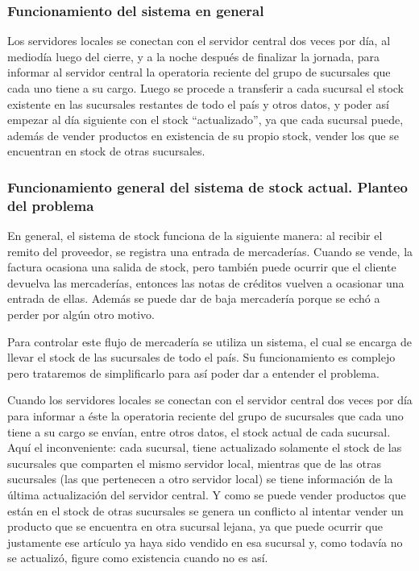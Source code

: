 \subsubsection{Funcionamiento del sistema en general}

Los servidores locales se conectan con el servidor central dos veces por día,
al mediodía luego del cierre, y a la noche después de finalizar la jornada,
para informar al servidor central la operatoria reciente del grupo de
sucursales que cada uno tiene a su cargo. Luego se procede a transferir a cada
sucursal el stock existente en las sucursales restantes de todo el país y otros
datos, y poder así empezar al día siguiente con el stock ``actualizado'', ya
que cada sucursal puede, además de vender productos en existencia de su propio
stock, vender los que se encuentran en stock de otras sucursales.


\subsubsection{Funcionamiento general del sistema de stock actual. Planteo del
problema}

En general, el sistema de stock funciona de la siguiente manera: al recibir el
remito del proveedor, se registra una entrada de mercaderías. Cuando se vende,
la factura ocasiona una salida de stock, pero también puede ocurrir que el
cliente devuelva las mercaderías, entonces las notas de créditos vuelven a
ocasionar una entrada de ellas. Además se puede dar de baja mercadería porque
se echó a perder por algún otro motivo.

Para controlar este flujo de mercadería se utiliza un sistema, el cual se
encarga de llevar el stock de las sucursales de todo el país. Su funcionamiento
es complejo pero trataremos de simplificarlo para así poder dar a entender el
problema. 

Cuando los servidores locales se conectan con el servidor central dos veces por
día para informar a éste la operatoria reciente del grupo de sucursales que
cada uno tiene a su cargo se envían, entre otros datos, el stock actual de cada
sucursal. Aquí el inconveniente: cada sucursal, tiene actualizado solamente el
stock de las sucursales que comparten el mismo servidor local, mientras que de
las otras sucursales (las que pertenecen a otro servidor local) se tiene
información de la última actualización del servidor central. Y como se puede
vender productos que están en el stock de otras sucursales se genera un
conflicto al intentar vender un producto que se encuentra en otra sucursal
lejana, ya que puede ocurrir que justamente ese artículo ya haya sido vendido
en esa sucursal y, como todavía no se actualizó, figure como existencia cuando
no es así.

